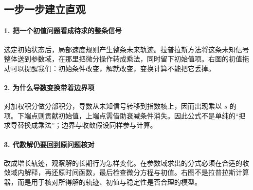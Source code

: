 \subsection*{一步一步建立直观}

\paragraph{1. 把一个初值问题看成待求的整条信号}

选定初始状态后，局部速度规则产生整条未来轨迹。拉普拉斯方法将这条未知信号整体送到参数域，在那里把微分操作转成乘法，同时留下初始值项。右图的初值拖动可以提醒我们：初始条件改变，解就改变，变换计算不能把它丢掉。



\paragraph{2. 为什么导数变换带着边界项}

对加权积分做分部积分，导数从未知信号转移到指数核上，因而出现乘以 $s$ 的项。下端点则贡献初始值，上端点需借助衰减条件消失。因此公式不是单纯的“把求导替换成乘法”；边界与收敛假设同样参与计算。



\paragraph{3. 代数解仍要回到原问题核对}

改成增长轨迹，观察解的长期行为怎样变化。在参数域求出的分式必须在合适的收敛域内解释，再还原时间函数，最后检查微分方程与初值。右图不是拉普拉斯计算器，而是用于核对所得解的轨迹、初值与稳定性是否合理的模型。
